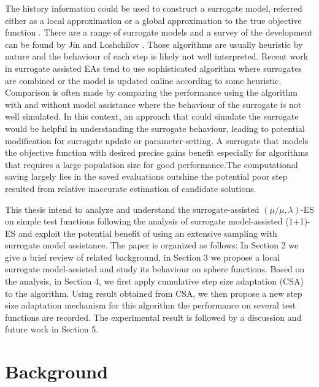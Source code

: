 The history information could be used to construct a surrogate model, referred either as a local approximation or a global approximation to the true objective function \cite{Jin:2002:FAE:2955491.2955686}. There are a range of surrogate models and a survey of the development can be found by Jin \cite{JIN201161} and Loshchilov \cite{ECJ2016_LMCMA}. Those algorithms are usually heuristic by nature and the behaviour of each step is likely not well interpreted. Recent work in surrogate assisted EAs tend to use sophisticated algorithm where surrogates are combined or the model is updated online according to some heuristic. Comparison is often made by comparing the performance using the algorithm with and without model assistance where the behaviour of the surrogate is not well simulated. In this context, an approach that could simulate the surrogate would be helpful in understanding the surrogate behaviour, leading to potential modification for surrogate update or parameter-setting. A surrogate that models the objective function with desired precise gains benefit especially for algorithms that requires a large population size for good performance.The computational saving largely lies in the saved evaluations outshine the potential poor step resulted from relative inaccurate estimation of candidate solutions. 



This thesis intend to analyze and understand the surrogate-assisted $(\mu/\mu,\lambda)$-ES on simple test functions following the analysis of  surrogate model-assisted (1+1)-ES \cite{DBLP:conf/ppsn/KayhaniA18} and exploit the potential benefit of using an extensive sampling with surrogate model assistance. The paper is organized as follows: In Section 2 we give a brief review of related background, in Section 3 we propose a local surrogate model-assisted  and study its behaviour on sphere functions. Based on the analysis, in Section 4, we first apply cumulative step size adaptation (CSA) to the algorithm. Using result obtained from CSA, we then propose a new step size adaptation mechanism for this algorithm the performance on several test functions are recorded. The experimental result is followed by a discussion and future work in Section 5. 



\section{Background}
